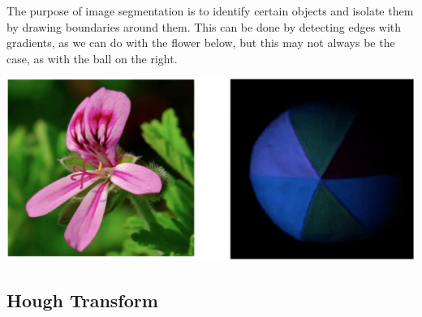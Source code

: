 \documentclass{article}
\begin{document}
    The purpose of image segmentation is to identify certain objects and isolate them by drawing boundaries around them. This can be done by detecting edges with gradients, as we can do with the flower below, but this may not always be the case, as with the ball on the right. 
    \begin{center}
        \includegraphics[scale=0.2]{img/segmengation_example.png}
    \end{center}

  \subsection{Hough Transform}
\end{document}
